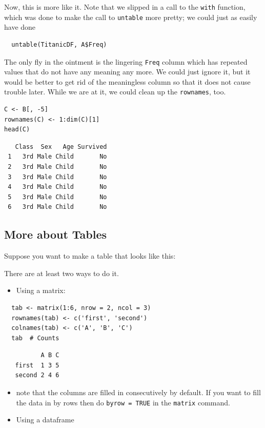 \documentclass[captions=tableheading]{scrbook}
\begin{document}
Now, this is more like it. Note that we slipped in a call to the \texttt{with} function, which was done to make the call to \texttt{untable} more pretty; we could just as easily have done
\begin{verbatim}
  untable(TitanicDF, A$Freq)
\end{verbatim}


The only fly in the ointment is the lingering \texttt{Freq} column which has repeated values that do not have any meaning any more. We could just ignore it, but it would be better to get rid of the meaningless column so that it does not cause trouble later. While we are at it, we could clean up the \texttt{rownames}, too.


\begin{verbatim}
C <- B[, -5]
rownames(C) <- 1:dim(C)[1]
head(C)
\end{verbatim}

\begin{verbatim}
   Class  Sex   Age Survived
 1   3rd Male Child       No
 2   3rd Male Child       No
 3   3rd Male Child       No
 4   3rd Male Child       No
 5   3rd Male Child       No
 6   3rd Male Child       No
\end{verbatim}
\subsection{More about Tables}
\label{sec-20-1-6}

Suppose you want to make a table that looks like this:

There are at least two ways to do it.

\begin{itemize}
\item Using a matrix:
\end{itemize}

\begin{verbatim}
  tab <- matrix(1:6, nrow = 2, ncol = 3)
  rownames(tab) <- c('first', 'second')
  colnames(tab) <- c('A', 'B', 'C')
  tab  # Counts
\end{verbatim}

\begin{verbatim}
          A B C
   first  1 3 5
   second 2 4 6
\end{verbatim}

\begin{itemize}
\item note that the columns are filled in consecutively by default. If you want to fill the data in by rows then do \texttt{byrow = TRUE} in the \texttt{matrix} command.
\item Using a dataframe
\end{itemize}
\end{document}
